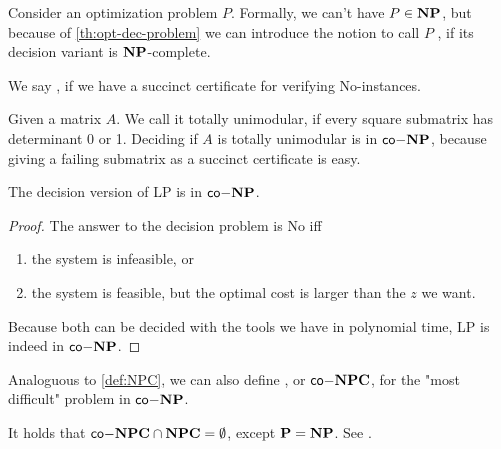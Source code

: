 \begin{definition}[$\NP$-hard]
    Consider an optimization problem $P$. Formally, we can't have $P \in \mathbf{NP}$, but because of \autoref{th:opt-dec-problem}
    we can introduce the notion to call $P$ , if its decision variant is $\NP$-complete.
\end{definition}
\begin{definition}[$\coNP$]
    We say , if we have a succinct certificate for verifying No-instances.
\end{definition}
\begin{example}
    Given a matrix $A$. We call it totally unimodular, if every square submatrix has determinant 0 or 1.
    Deciding if $A$ is totally unimodular is in $\coNP$, because giving a failing submatrix as a succinct certificate is easy.
\end{example}
\begin{theorem}
    The decision version of LP is in $\coNP$. \label{thm:LP-coNP}
\end{theorem}
\begin{proof}
    The answer to the decision problem is No iff
    \begin{enumerate}
        \item the system is infeasible, or
        \item the system is feasible, but the optimal cost is larger than the $z$ we want.
    \end{enumerate}
    Because both can be decided with the tools we have in polynomial time, LP is indeed in $\coNP$.
\end{proof}
\begin{definition}
    Analoguous to \autoref{def:NPC}, we can also define , or $\mathsf{co-}\mathbf{NPC}$, for the "most difficult" problem in $\coNP$.
\end{definition}
\begin{remark}
    It holds that $\mathsf{co-}\mathbf{NPC} \cap \mathbf{NPC} = \emptyset$, except $\mathbf{P} = \mathbf{NP}$. See \cite{comb-optimization-korte}.
\end{remark}

